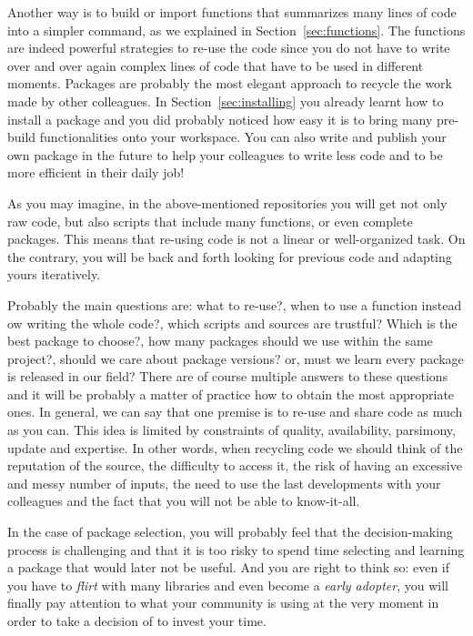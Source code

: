 Another way is to build or import functions that summarizes many lines of code into a simpler command, as we explained in Section~\ref{sec:functions}. The functions are indeed powerful strategies to re-use the code since you do not have to write over and over again complex lines of code that have to be used in different moments. Packages are probably the most elegant approach to recycle the work made by other colleagues. In Section~\ref{sec:installing} you already learnt how to install a package and you did probably noticed how easy it is to bring many pre-build functionalities onto your workspace. You can also write and publish your own package in the future to help your colleagues to write less code and to be more efficient in their daily job!

As you may imagine, in the above-mentioned repositories you will get not only raw code, but also scripts that include many functions, or even complete packages. This means that re-using code is not a linear or well-organized task. On the contrary, you will be back and forth looking for previous code and adapting yours iteratively.

Probably the main questions are: what to re-use?, when to use a function instead ow writing the whole code?, which scripts and sources are trustful? Which is the best package to choose?, how many packages should we use within the same project?, should we care about package versions? or, must we learn every package is released in our field? There are of course multiple answers to these questions and it will be probably a matter of practice how to obtain the most appropriate ones. In general, we can say that one premise is to re-use and share code as much as you can. This idea is limited by constraints of quality, availability, parsimony, update and expertise. In other words, when recycling code we should think of the reputation of the source, the difficulty to access it, the risk of having an excessive and messy number of inputs, the need to use the last developments with your colleagues and the fact that you will not be able to know-it-all.

In the case of package selection, you will probably feel that the decision-making process is challenging and that it is too risky to spend time selecting and learning a package that would later not be useful. And you are right to think so: even if you have to  \textit{flirt} with many libraries and even become a \textit{early adopter}, you will finally pay attention to what your community is using at the very moment in order to take a decision of to invest your time. 

